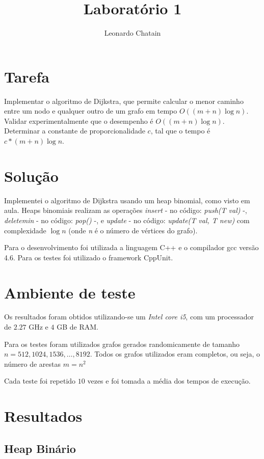\documentclass{article}
\title{Laboratório 1}
\author{Leonardo Chatain}
\begin{document}
\maketitle

\section{Tarefa}
Implementar o algoritmo de Dijkstra, que permite calcular o menor caminho entre um nodo e qualquer outro de um grafo em tempo $O((m + n) \log n)$. Validar experimentalmente que o desempenho é $O((m + n) \log n)$. Determinar a constante de proporcionalidade $c$, tal que o tempo é $c*(m + n) \log n$.

\section{Solução}
Implementei o algoritmo de Dijkstra usando um heap binomial, como visto em aula. Heaps binomiais realizam as operações \emph{insert} - no código: \emph{push(T val)} -, \emph{deletemin} - no código: \emph{pop()} -, e \emph{update} - no código: \emph{update(T val, T new)} com complexidade $ \log n $ (onde \emph{n} é o número de vértices do grafo).

Para o desenvolvimento foi utilizada a linguagem C++ e o compilador gcc versão 4.6. Para os testes foi utilizado o framework CppUnit.

\section{Ambiente de teste}

Os resultados foram obtidos utilizando-se um \emph{Intel core i5}, com um processador de $2.27$ GHz e $4$ GB de RAM.

Para os testes foram utilizados grafos gerados randomicamente de tamanho $n=512,1024,1536,\ldots,8192$. Todos os grafos utilizados eram completos, ou seja, o número de arestas $m=n ^ 2$

Cada teste foi repetido $10$ vezes e foi tomada a média dos tempos de execução.

\section{Resultados}

\subsection{Heap Binário}
\end{document}
